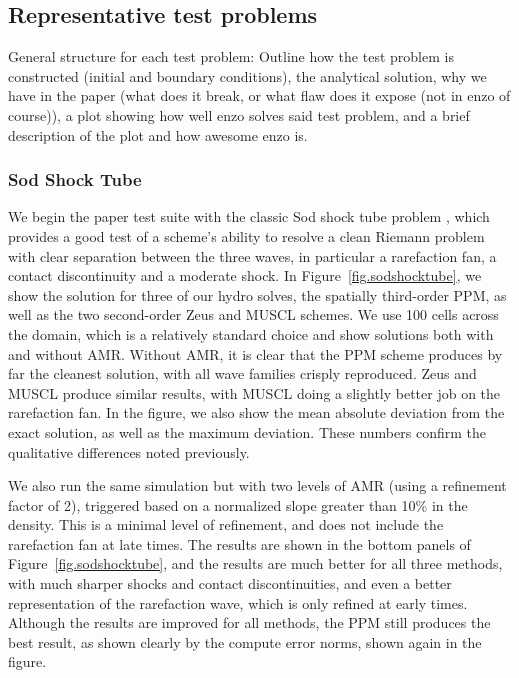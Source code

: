 \subsection{Representative test problems}
\label{sec.tests.problems}

General structure for each test problem:  Outline how the test problem is constructed (initial and boundary conditions), 
the analytical solution, why we have in the paper (what does it break, or what flaw does it expose (not in enzo of course)),
a plot showing how well enzo solves said test problem, and a brief description of the plot and how awesome enzo is.

\subsubsection{Sod Shock Tube}
\label{sec.tests.sodshock}

We begin the paper test suite with the classic Sod shock tube problem \citep{Sod78}, which provides a good test of a scheme's ability to resolve a clean Riemann problem with clear separation between the three waves, in particular a rarefaction fan, a contact discontinuity and a moderate shock.  In Figure~\ref{fig.sodshocktube}, we show the solution for three of our hydro solves, the spatially third-order PPM, as well as the two second-order Zeus and MUSCL schemes.  We use 100 cells across the domain, which is a relatively standard choice and show solutions both with and without AMR.  Without AMR, it is clear that the PPM scheme produces by far the cleanest solution, with all wave families crisply reproduced.  Zeus and MUSCL produce similar results, with MUSCL doing a slightly better job on the rarefaction fan.  In the figure, we also show the mean absolute deviation from the exact solution, as well as the maximum deviation.  These numbers confirm the qualitative differences noted previously.

We also run the same simulation but with two levels of AMR (using a refinement factor of 2), triggered based on a normalized slope greater than 10\% in the density.  This is a minimal level of refinement, and does not include the rarefaction fan at late times.  The results are shown in the bottom panels of Figure~\ref{fig.sodshocktube}, and the results are much better for all three methods, with much sharper shocks and contact discontinuities, and even a better representation of the rarefaction wave, which is only refined at early times.  Although the results are improved for all methods, the PPM still produces the best result, as shown clearly by the compute error norms, shown again in the figure.

